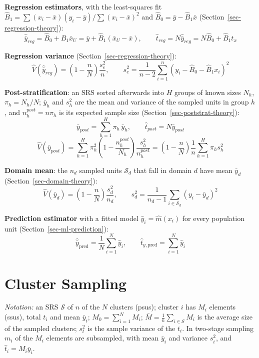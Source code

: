 \documentclass[
  letterpaper,
  DIV=11,
  numbers=noendperiod]{scrreprt}
\renewcommand{\[}{\begin{equation}}
\renewcommand{\]}{\end{equation}}
\begin{document}
\textbf{Regression estimators}, with the least-squares fit
\(\hat B_1 = \sum(x_i-\bar x)(y_i-\bar y)/\sum(x_i-\bar x)^2\) and
\(\hat B_0 = \bar y - \hat B_1\bar x\)
(Section~\ref{sec-regression-theory}): \[
\boxed{\hat{\bar y}_{reg} = \hat B_0 + \hat B_1\bar x_U = \bar y + \hat B_1\left(\bar x_U - \bar x\right),
\qquad
\hat t_{reg} = N\hat{\bar y}_{reg} = N\hat B_0 + \hat B_1 t_x}
\]

\textbf{Regression variance} (Section~\ref{sec-regression-theory}): \[
\boxed{\hat V(\hat{\bar y}_{reg}) = \left(1 - \frac nN\right)\frac{s_e^2}{n},
\qquad
s_e^2 = \frac{1}{n-2}\sum_{i=1}^n\left(y_i - \hat B_0 - \hat B_1 x_i\right)^2}
\]

\textbf{Post-stratification}: an SRS sorted afterwards into \(H\) groups
of known sizes \(N_h\), \(\pi_h = N_h/N\); \(\bar y_h\) and \(s_h^2\)
are the mean and variance of the sampled units in group \(h\), and
\(n_h^{post} = n\pi_h\) is its expected sample size
(Section~\ref{sec-poststrat-theory}): \[
\boxed{\bar y_{post} = \sum_{h=1}^H \pi_h\,\bar y_h,
\qquad
\hat t_{post} = N\bar y_{post}}
\] \[
\boxed{\hat V(\bar y_{post}) = \sum_{h=1}^H \pi_h^2\left(1 - \frac{n_h^{post}}{N_h}\right)\frac{s_h^2}{n_h^{post}}
= \left(1 - \frac nN\right)\frac1n\sum_{h=1}^H \pi_h s_h^2}
\]

\textbf{Domain mean}: the \(n_d\) sampled units \(\mathcal S_d\) that
fall in domain \(d\) have mean \(\bar y_d\)
(Section~\ref{sec-domain-theory}): \[
\boxed{\hat V(\bar y_d) = \left(1 - \frac nN\right)\frac{s_d^2}{n_d},
\qquad
s_d^2 = \frac{1}{n_d - 1}\sum_{i \in \mathcal S_d}\left(y_i - \bar y_d\right)^2}
\]

\textbf{Prediction estimator} with a fitted model
\(\hat y_i = \hat m(x_i)\) for every population unit
(Section~\ref{sec-ml-prediction}): \[
\boxed{\hat{\bar y}_{\text{pred}} = \frac1N\sum_{i=1}^N \hat y_i, \qquad
\hat t_{y,\text{pred}} = \sum_{i=1}^N \hat y_i}
\]

\section{Cluster Sampling}\label{cluster-sampling-1}

\emph{Notation:} an SRS \(\mathcal S\) of \(n\) of the \(N\) clusters
(psus); cluster \(i\) has \(M_i\) elements (ssus), total \(t_i\) and
mean \(\bar y_i\); \(M_0 = \sum_{i=1}^N M_i\);
\(\bar M = \frac1n\sum_{i\in\mathcal S}M_i\) is the average size of the
sampled clusters; \(s_t^2\) is the sample variance of the \(t_i\). In
two-stage sampling \(m_i\) of the \(M_i\) elements are subsampled, with
mean \(\bar y_i\) and variance \(s_i^2\), and
\(\hat t_i = M_i\bar y_i\).
\end{document}

